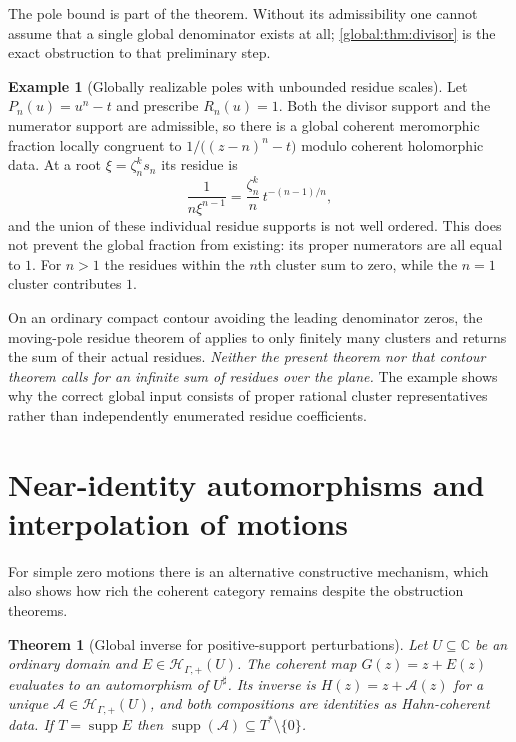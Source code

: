 \documentclass[11pt,letterpaper]{article}
\newtheorem{theorem}{Theorem}[section]
\theoremstyle{definition}
\newtheorem{example}[example]{Example}
\theoremstyle{remark}
\newcommand{\C}{\mathbb C}
\newcommand{\HP}{\mathscr H_{\Gamma,+}}
\newcommand{\sh}{^{\sharp}}
\newcommand{\supp}{\operatorname{supp}}
\numberwithin{equation}{section}
\begin{document}
The pole bound is part of the theorem. Without its admissibility one cannot assume that a single global denominator exists at all; \cref{global:thm:divisor} is the exact obstruction to that preliminary step.

\begin{example}[Globally realizable poles with unbounded residue scales]\label{global:ex:MLresidues}
Let $P_n(u)=u^n-t$ and prescribe $R_n(u)=1$. Both the divisor support and the numerator support are admissible, so there is a global coherent meromorphic fraction locally congruent to $1/\bigl((z-n)^n-t\bigr)$ modulo coherent holomorphic data. At a root $\xi=\zeta_n^ks_n$ its residue is
\begin{equation}\label{global:eq:individualresidues}
  \frac1{n\xi^{n-1}}=\frac{\zeta_n^k}{n}\,t^{-(n-1)/n},
\end{equation}
and the union of these individual residue supports is not well ordered. This does not prevent the global fraction from existing: its proper numerators are all equal to $1$. For $n>1$ the residues within the $n$th cluster sum to zero, while the $n=1$ cluster contributes $1$.
\end{example}

On an ordinary compact contour avoiding the leading denominator zeros, the moving-pole residue theorem of \cite{Source} applies to only finitely many clusters and returns the sum of their actual residues. \emph{Neither the present theorem nor that contour theorem calls for an infinite sum of residues over the plane.} The example shows why the correct global input consists of proper rational cluster representatives rather than independently enumerated residue coefficients.

\section{Near-identity automorphisms and interpolation of motions}\label{global:sec:aut}

For simple zero motions there is an alternative constructive mechanism, which also shows how rich the coherent category remains despite the obstruction theorems.

\begin{theorem}[Global inverse for positive-support perturbations]\label{global:thm:aut}
Let $U\subseteq\C$ be an ordinary domain and $E\in\HP(U)$. The coherent map $G(z)=z+E(z)$ evaluates to an automorphism of $U\sh$. Its inverse is $H(z)=z+\mathcal A(z)$ for a unique $\mathcal A\in\HP(U)$, and both compositions are identities as Hahn-coherent data. If $T=\supp E$ then $\supp(\mathcal A)\subseteq T^*\setminus\{0\}$.
\end{theorem}
\end{document}
